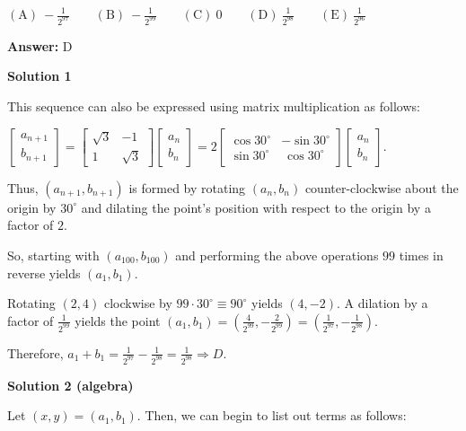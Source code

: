 \begin{enumerate}
 $\mathrm{(A)}\ -\frac{1}{2^{97}}\qquad\mathrm{(B)}\ -\frac{1}{2^{99}}\qquad\mathrm{(C)}\ 0\qquad\mathrm{(D)}\ \frac{1}{2^{98}}\qquad\mathrm{(E)}\ \frac{1}{2^{96}}$

 \textbf{Answer: }D



\textbf{Solution 1}

This sequence can also be expressed using matrix multiplication as follows: 

 $\left[ \begin{array}{c} a_{n+1} \\ b_{n+1} \end{array} \right] = \left[ \begin{array}{cc} \sqrt{3} & -1 \\ 1 & \sqrt{3} \end{array} \right] \left[ \begin{array}{c} a_{n} \\ b_{n} \end{array} \right] = 2 \left[ \begin{array}{cc} \cos 30^\circ & -\sin 30^\circ \\ \sin 30^\circ & \ \cos 30^\circ \end{array} \right] \left[ \begin{array}{c} a_{n} \\ b_{n} \end{array} \right]$. 

 Thus, $(a_{n+1} , b_{n+1})$ is formed by rotating $(a_n , b_n)$ counter-clockwise about the origin by $30^\circ$ and dilating the point's position with respect to the origin by a factor of $2$. 

 So, starting with $(a_{100},b_{100})$ and performing the above operations $99$ times in reverse yields $(a_1,b_1)$. 

 Rotating $(2,4)$ clockwise by $99 \cdot 30^\circ \equiv 90^\circ$ yields $(4,-2)$. A dilation by a factor of $\frac{1}{2^{99}}$ yields the point $(a_1,b_1) = \left(\frac{4}{2^{99}}, -\frac{2}{2^{99}} \right) = \left(\frac{1}{2^{97}}, -\frac{1}{2^{98}} \right)$. 

 Therefore, $a_1 + b_1 = \frac{1}{2^{97}} - \frac{1}{2^{98}} = \frac{1}{2^{98}} \Rightarrow D$.

 



\textbf{Solution 2 (algebra)}

Let $(x,y)=(a_1,b_1)$. Then, we can begin to list out terms as follows:


\end{enumerate}
